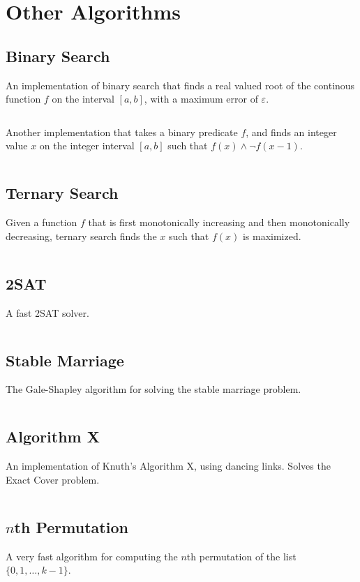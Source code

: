 \documentclass[9pt,a4paper,twocolumn,landscape,oneside]{amsart}
\newcommand{\code}[1]{\inputminted{cpp}{_code/#1}}
\begin{document}
\section{Other Algorithms}
    \subsection{Binary Search}
        An implementation of binary search that finds a real valued root of the
        continous function $f$ on the interval $[a,b]$, with a maximum error of
        $\varepsilon$.
        \code{other/binary_search_continuous.cpp}

        Another implementation that takes a binary predicate $f$, and finds an
        integer value $x$ on the integer interval $[a,b]$ such that $f(x) \land
        \lnot f(x - 1)$.
        \code{other/binary_search_discrete.cpp}

    \subsection{Ternary Search}
        Given a function $f$ that is first monotonically increasing and then
        monotonically decreasing, ternary search finds the $x$ such that $f(x)$ is
        maximized.
        \code{other/ternary_search_continuous.cpp}

    \subsection{2SAT}
        A fast 2SAT solver.
        \code{other/two_sat.cpp}

    \subsection{Stable Marriage}
        The Gale-Shapley algorithm for solving the stable marriage problem.
        \code{other/stable_marriage.cpp}

    \subsection{Algorithm X}
        An implementation of Knuth's Algorithm X, using dancing links. Solves the Exact Cover problem.
        \code{other/algorithm_x.cpp}

    \subsection{$n$th Permutation}
        A very fast algorithm for computing the $n$th permutation of the list
        $\{0,1,\ldots,k-1\}$.
        \code{other/nth_permutation.cpp}
\end{document}
